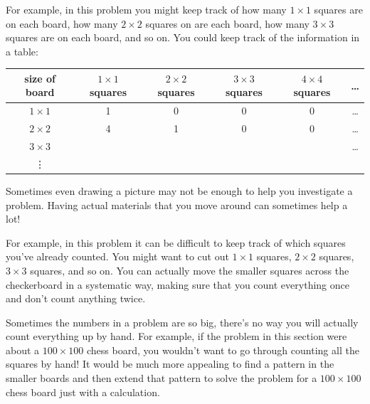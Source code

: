  For example, in this problem you might keep track of how many $1\times 1$ squares are on each board, how many $2\times2$ squares on are each board, how many $3 \times 3$ squares are on each board, and so on.  You could keep track of the information in a table:
 
 \begin{tabular}{ |c| | c| c| c| c| c|  }\hline
 size of board &  $1 \times 1 $ squares &  $2 \times 2 $ squares &  $3 \times 3 $ squares &  $4 \times 4 $ squares & \dots \\\hline\hline
 $1 \times 1 $ & 1 & 0 & 0 & 0 & \dots\\
 \hline
 $2 \times 2 $ & 4 & 1 & 0 & 0 & \dots\\
 \hline
  $3 \times 3 $ &   &   &   &   & \dots\\
  \hline
  \vdots &  & & & & \\
  \hline
\end{tabular}


\begin{ps}
Sometimes even drawing a picture may not be enough to help you investigate a problem.  Having actual materials that you move around can sometimes help a lot!
\end{ps}

For example, in this problem it can be difficult to keep track of which squares you've already counted.  You might want to cut out $1 \times 1$ squares, $2 \times 2$ squares, $3 \times 3$ squares, and so on.  You can actually move the smaller squares across the checkerboard in a systematic way, making sure that you count everything once and don't count anything twice.



\begin{ps}
Sometimes the numbers in a problem are so big, there's no way you will actually count everything up by hand.  For example, if the problem in this section were about a $100 \times 100$ chess board, you wouldn't want to go through counting all the squares by hand!  It would be much more appealing to find a pattern in the smaller boards and then extend that pattern to solve the problem for a $100 \times 100$ chess board just with a calculation.
\end{ps}


